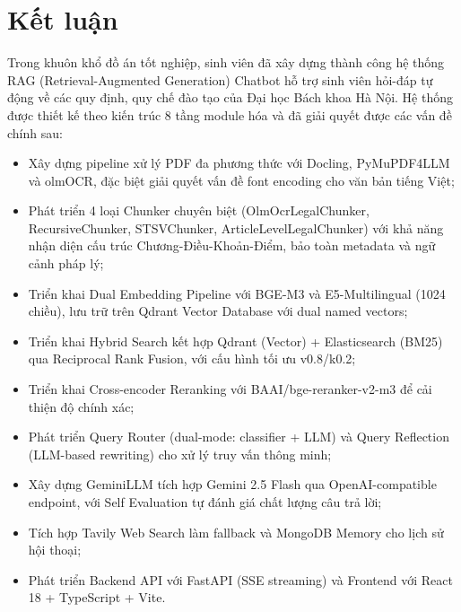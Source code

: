 \documentclass[../DoAn.tex]{subfiles}
\begin{document}
\section{Kết luận}

Trong khuôn khổ đồ án tốt nghiệp, sinh viên đã xây dựng thành công hệ thống RAG (Retrieval-Augmented Generation) Chatbot hỗ trợ sinh viên hỏi-đáp tự động về các quy định, quy chế đào tạo của Đại học Bách khoa Hà Nội. Hệ thống được thiết kế theo kiến trúc 8 tầng module hóa và đã giải quyết được các vấn đề chính sau:

\begin{itemize}
    \item Xây dựng pipeline xử lý PDF đa phương thức với Docling, PyMuPDF4LLM và olmOCR, đặc biệt giải quyết vấn đề font encoding cho văn bản tiếng Việt;
    
    \item Phát triển 4 loại Chunker chuyên biệt (OlmOcrLegalChunker, RecursiveChunker, STSVChunker, ArticleLevelLegalChunker) với khả năng nhận diện cấu trúc Chương-Điều-Khoản-Điểm, bảo toàn metadata và ngữ cảnh pháp lý;
    
    \item Triển khai Dual Embedding Pipeline với BGE-M3 và E5-Multilingual (1024 chiều), lưu trữ trên Qdrant Vector Database với dual named vectors;
    
    \item Triển khai Hybrid Search kết hợp Qdrant (Vector) + Elasticsearch (BM25) qua Reciprocal Rank Fusion, với cấu hình tối ưu v0.8/k0.2;
    
    \item Triển khai Cross-encoder Reranking với BAAI/bge-reranker-v2-m3 để cải thiện độ chính xác;
    
    \item Phát triển Query Router (dual-mode: classifier + LLM) và Query Reflection (LLM-based rewriting) cho xử lý truy vấn thông minh;
    
    \item Xây dựng GeminiLLM tích hợp Gemini 2.5 Flash qua OpenAI-compatible endpoint, với Self Evaluation tự đánh giá chất lượng câu trả lời;
    
    \item Tích hợp Tavily Web Search làm fallback và MongoDB Memory cho lịch sử hội thoại;
    
    \item Phát triển Backend API với FastAPI (SSE streaming) và Frontend với React 18 + TypeScript + Vite.
\end{itemize}
\end{document}
